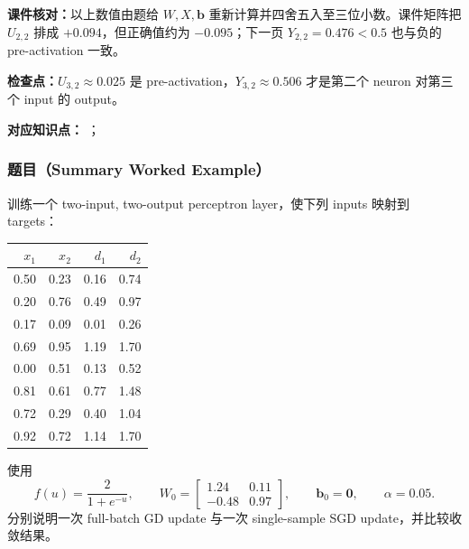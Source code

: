 \textbf{课件核对：}以上数值由题给 $W,X,\bm b$ 重新计算并四舍五入至三位小数。课件矩阵把 $U_{2,2}$ 排成 $+0.094$，但正确值约为 $-0.095$；下一页 $Y_{2,2}=0.476<0.5$ 也与负的 pre-activation 一致。

\textbf{检查点：}$U_{3,2}\approx0.025$ 是 pre-activation，$Y_{3,2}\approx0.506$ 才是第二个 neuron 对第三个 input 的 output。


\textbf{对应知识点：}
；

\subsubsection*{题目（Summary Worked Example）}

训练一个 two-input, two-output perceptron layer，使下列 inputs 映射到 targets：
\begin{center}
\small
\begin{tabular}{@{}rrrr@{}}
  \toprule
  $x_1$ & $x_2$ & $d_1$ & $d_2$ \\
  \midrule
  0.50&0.23&0.16&0.74\\
  0.20&0.76&0.49&0.97\\
  0.17&0.09&0.01&0.26\\
  0.69&0.95&1.19&1.70\\
  0.00&0.51&0.13&0.52\\
  0.81&0.61&0.77&1.48\\
  0.72&0.29&0.40&1.04\\
  0.92&0.72&1.14&1.70\\
  \bottomrule
\end{tabular}
\end{center}
使用
\[
  f(u)=\frac{2}{1+e^{-u}},
  \qquad
  W_0=
  \begin{bmatrix}1.24&0.11\\-0.48&0.97\end{bmatrix},
  \qquad
  \bm b_0=\bm0,
  \qquad
  \alpha=0.05.
\]
分别说明一次 full-batch GD update 与一次 single-sample SGD update，并比较收敛结果。

